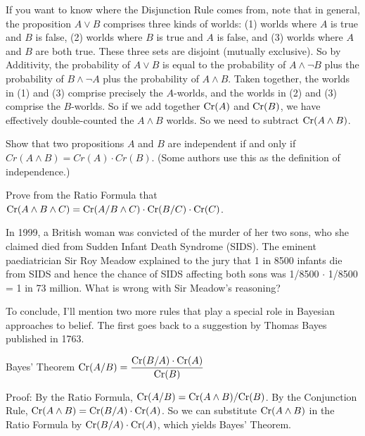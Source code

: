 If you want to know where the Disjunction Rule comes from, note that
in general, the proposition $A\lor B$ comprises three kinds of worlds:
(1) worlds where $A$ is true and $B$ is false, (2) worlds where $B$ is
true and $A$ is false, and (3) worlds where $A$ and $B$ are both true.
These three sets are disjoint (mutually exclusive). So by Additivity,
the probability of $A \lor B$ is equal to the probability of
$A \land \neg B$ plus the probability of $B \land \neg A$ plus the
probability of $A \land B$. Taken together, the worlds in (1) and (3)
comprise precisely the $A$-worlds, and the worlds in (2) and (3)
comprise the $B$-worlds. So if we add together $\text{Cr}(A)$ and $\text{Cr}(B)$,
we have effectively double-counted the $A \land B$ worlds. So we need
to subtract $\text{Cr}(A \land B)$.

\begin{exercise1}
  Show that two propositions $A$ and $B$ are independent if and only
  if $Cr(A \land B) = Cr(A) \cdot Cr(B)$. (Some authors use this as
  the definition of independence.) 
\end{exercise1}

\begin{exercise2}\label{e:chain-rule}
  Prove from the Ratio Formula that $\text{Cr}(A \land B \land C) = \text{Cr}(A/B
  \land C) \cdot \text{Cr}(B/C) \cdot \text{Cr}(C)$.
  \vspace{-2mm}
\end{exercise2}

\begin{exercise1}
  In 1999, a British woman was convicted of the murder of her two
  sons, who she claimed died from Sudden Infant Death Syndrome
  (SIDS). The eminent paediatrician Sir Roy Meadow explained to the
  jury that 1 in 8500 infants die from SIDS and hence the chance of
  SIDS affecting both sons was 1/8500 $\cdot$ 1/8500 = 1 in 73
  million. What is wrong with Sir Meadow's reasoning? 
\end{exercise1}

To conclude, I'll mention two more rules that play a special role in
Bayesian approaches to belief. The first goes back to a suggestion by Thomas
Bayes published in 1763.
%
\begin{genericthm}{Bayes' Theorem}
  \leavevmode\vspace{-3mm}
  \quad\newline
  $\text{Cr}(A/B) = \dfrac{\text{Cr}(B/A) \cdot \text{Cr}(A)}{\text{Cr}(B)}$
\end{genericthm}
%
Proof: By the Ratio Formula, $\text{Cr}(A/B) = \text{Cr}(A \land B) / \text{Cr}(B)$. By
the Conjunction Rule, $\text{Cr}(A \land B) = \text{Cr}(B/A) \cdot \text{Cr}(A)$. So we
can substitute $\text{Cr}(A \land B)$ in the Ratio Formula by
$\text{Cr}(B/A)\cdot \text{Cr}(A)$, which yields Bayes' Theorem.

